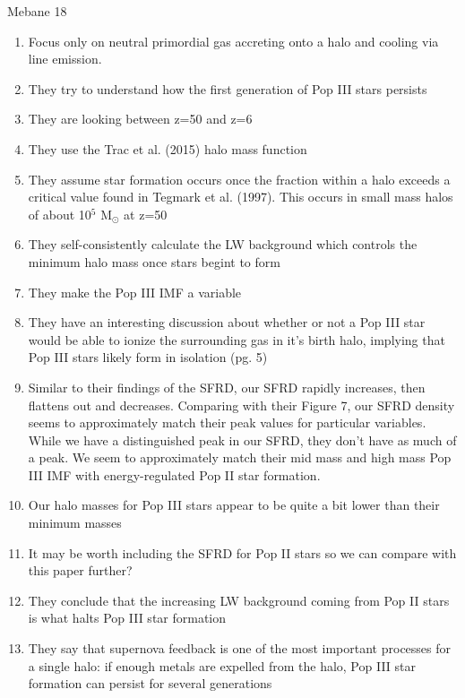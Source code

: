 \documentclass[a4paper,fleqn,usenatbib]{mnras}
\begin{document}
\li Mebane 18
\begin{enumerate}
	\item Focus only on neutral primordial gas accreting onto a halo and cooling via \hh{} line emission.
	\item They try to understand how the first generation of Pop III stars persists
	\item They are looking between z=50 and z=6
	\item They use the Trac et al. (2015) halo mass function
	\item They assume star formation occurs once the \hh{} fraction within a halo exceeds a critical value found in Tegmark et al. (1997). This occurs in small mass halos of about 10$^{5}$ M$_{\odot}$ at z=50
	\item They self-consistently calculate the LW background which controls the minimum halo mass once stars begint to form
	\item They make the Pop III IMF a variable
	\item They have an interesting discussion about whether or not a Pop III star would be able to ionize the surrounding gas in it's birth halo, implying that Pop III stars likely form in isolation (pg. 5)
	\item Similar to their findings of the SFRD, our SFRD rapidly increases, then flattens out and decreases. Comparing with their Figure 7, our SFRD density seems to approximately match their peak values for particular variables. While we have a distinguished peak in our SFRD, they don't have as much of a peak. We seem to approximately match their mid mass and high mass Pop III IMF with energy-regulated Pop II star formation.
	\item Our halo masses for Pop III stars appear to be quite a bit lower than their minimum masses
	\item It may be worth including the SFRD for Pop II stars so we can compare with this paper further?
	\item They conclude that the increasing LW background coming from Pop II stars is what halts Pop III star formation
	\item They say that supernova feedback is one of the most important processes for a single halo: if enough metals are expelled from the halo, Pop III star formation can persist for several generations
\end{enumerate}
\end{document}
